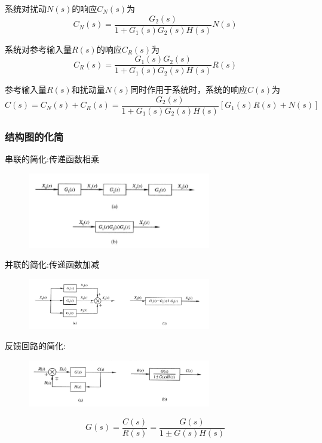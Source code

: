 \documentclass[12pt,a4paper,oneside]{ctexart}
\begin{document}
系统对扰动$N(s)$的响应$C_N(s)$为
\[
    C_N(s)=\frac{G_2(s)}{1+G_1(s)G_2(s)H(s)}N(s)
\]

系统对参考输入量$R(s)$的响应$C_R(s)$为
\[
    C_R(s) = \frac{G_1(s)G_2(s)}{1+G_1(s)G_2(s)H(s)}R(s)
\]

参考输入量$R(s)$和扰动量$N(s)$同时作用于系统时，系统的响应$C(s)$为
\[
    C(s) = C_N(s) + C_R(s) = \frac{G_2(s)}{1+G_1(s)G_2(s)H(s)}\left[G_1(s)R(s)+N(s)\right]
\]

\subsubsection{结构图的化简}
串联的简化:传递函数相乘
\begin{figure}[H]
    \centering
    \includegraphics[width=8cm]{photos/串联简化.png}
\end{figure}

并联的简化:传递函数加减
\begin{figure}[H]
    \centering
    \includegraphics[width=8cm]{photos/并联简化.png}
\end{figure}

反馈回路的简化:
\begin{figure}[H]
    \centering
    \includegraphics[width=8cm]{photos/反馈回路简化.png}
\end{figure}
\[
    G(s)=\frac{C(s)}{R(s)} = \frac{G(s)}{1\pm G(s)H(s)}
\]
\end{document}

